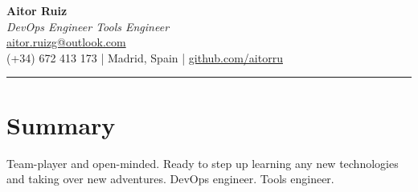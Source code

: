 \begin{center}
    {\LARGE \textbf{Aitor Ruiz}}\\[1ex]
    \textit{DevOps Engineer \textbullet{} Tools Engineer}\\
    \href{mailto:aitor.ruizg@outlook.com}{aitor.ruizg@outlook.com}\\
    (+34) 672 413 173 | Madrid, Spain | \href{https://github.com/aitorru}{github.com/aitorru} \\
\end{center}

\vspace{0.5em}\hrule\vspace{1em}

\section*{Summary}
Team-player and open-minded. Ready to step up learning any new technologies and taking over new adventures. DevOps engineer. Tools engineer.


